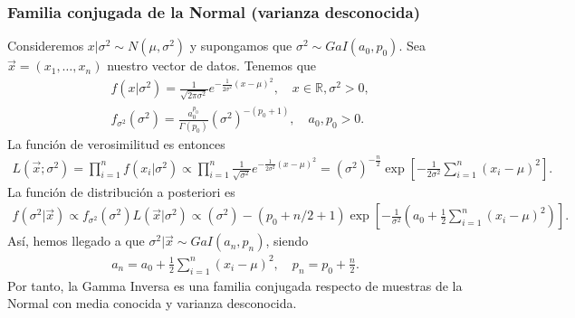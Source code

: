 \subsubsection{Familia conjugada de la Normal (varianza desconocida)}
Consideremos $x | \sigma^2 \sim N(\mu,\sigma^2)$ y supongamos que $\sigma^2 \sim GaI(a_0,p_0)$. Sea $\vec{x} = (x_1,\ldots,x_n)$ nuestro vector de datos. Tenemos que
\begin{align*}
     & f(x | \sigma^2) = \frac{1}{\sqrt{2\pi \sigma^2}} e^{- \frac{1}{2\sigma^2}(x -\mu)^2}, \quad x \in \mathbb{R}, \sigma^2 > 0, \\
     & f_{\sigma^2}(\sigma^2) = \frac{a_0^{p_0}}{\Gamma(p_0)} \left(\sigma^2\right)^{-(p_0+1)}, \quad a_0,p_0 > 0.
\end{align*}
La función de verosimilitud es entonces
\begin{align*}
    L(\vec{x}; \sigma^2) =  \prod_{i=1}^{n} f(x_i | \sigma^2) \propto \prod_{i=1}^{n} \frac{1}{\sqrt{\sigma^2}} e^{- \frac{1}{2\sigma^2}(x -\mu)^2} = \left(\sigma^2 \right)^{-\frac{n}{2}} \exp\left[ - \frac{1}{2\sigma^2} \sum_{i=1}^{n} (x_i - \mu)^2 \right].
\end{align*}
La función de distribución a posteriori es
\begin{align*}
    f(\sigma^2 | \vec{x}) \propto f_{\sigma^2}(\sigma^2) L(\vec{x} | \sigma^2) \propto \left(\sigma^2 \right)-(p_0 + n/2 + 1) \exp\left[- \frac{1}{\sigma^2}\left( a_0 + \frac{1}{2} \sum_{i=1}^{n} (x_i - \mu)^2\right)\right].
\end{align*}
Así, hemos llegado a que $\sigma^2 | \vec{x} \sim GaI(a_n,p_n)$, siendo
\begin{align*}
    a_n = a_0 + \frac{1}{2} \sum_{i=1}^{n} (x_i - \mu)^2, \quad p_n = p_0 + \frac{n}{2}.
\end{align*}
Por tanto, la Gamma Inversa es una familia conjugada respecto de muestras de la Normal con media conocida y varianza desconocida.


